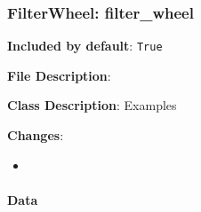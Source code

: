 \subsubsection{FilterWheel: \textquotedbl{}filter\_wheel\textquotedbl{}%
  \label{filterwheel-filter-wheel}%
}

\textbf{Included by default}: \texttt{True}

\textbf{File Description}:

\textbf{Class Description}: Examples

\textbf{Changes}:

\begin{itemize}
\item \end{itemize}


\paragraph{Data%
  \label{id1}%
}

\begin{figure}[H]
\noindent{}\label{fig-filter-wheel}
\end{figure}

